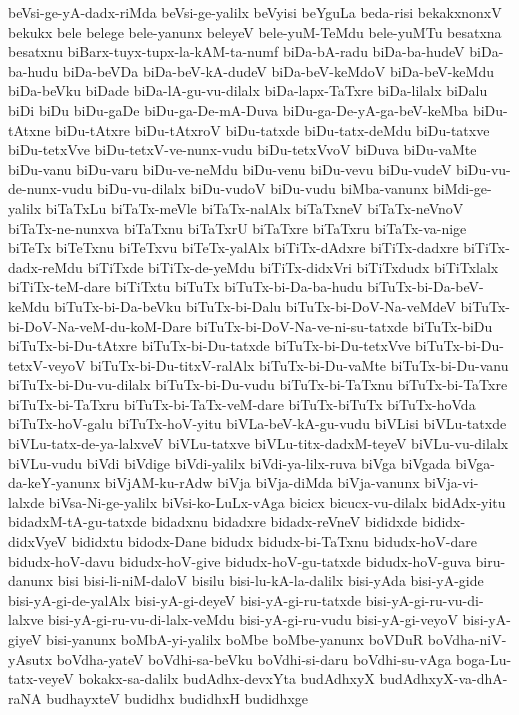 {beVsi-ge-yA-dadx-riMda
beVsi-ge-yalilx
beVyisi
beYguLa
beda-risi
bekakxnonxV
bekukx
bele
belege
bele-yanunx
beleyeV
bele-yuM-TeMdu
bele-yuMTu
besatxna
besatxnu
biBarx-tuyx-tupx-la-kAM-ta-numf
biDa-bA-radu
biDa-ba-hudeV
biDa-ba-hudu
biDa-beVDa
biDa-beV-kA-dudeV
biDa-beV-keMdoV
biDa-beV-keMdu
biDa-beVku
biDade
biDa-lA-gu-vu-dilalx
biDa-lapx-TaTxre
biDa-lilalx
biDalu
biDi
biDu
biDu-gaDe
biDu-ga-De-mA-Duva
biDu-ga-De-yA-ga-beV-keMba
biDu-tAtxne
biDu-tAtxre
biDu-tAtxroV
biDu-tatxde
biDu-tatx-deMdu
biDu-tatxve
biDu-tetxVve
biDu-tetxV-ve-nunx-vudu
biDu-tetxVvoV
biDuva
biDu-vaMte
biDu-vanu
biDu-varu
biDu-ve-neMdu
biDu-venu
biDu-vevu
biDu-vudeV
biDu-vu-de-nunx-vudu
biDu-vu-dilalx
biDu-vudoV
biDu-vudu
biMba-vanunx
biMdi-ge-yalilx
biTaTxLu
biTaTx-meVle
biTaTx-nalAlx
biTaTxneV
biTaTx-neVnoV
biTaTx-ne-nunxva
biTaTxnu
biTaTxrU
biTaTxre
biTaTxru
biTaTx-va-nige
biTeTx
biTeTxnu
biTeTxvu
biTeTx-yalAlx
biTiTx-dAdxre
biTiTx-dadxre
biTiTx-dadx-reMdu
biTiTxde
biTiTx-de-yeMdu
biTiTx-didxVri
biTiTxdudx
biTiTxlalx
biTiTx-teM-dare
biTiTxtu
biTuTx
biTuTx-bi-Da-ba-hudu
biTuTx-bi-Da-beV-keMdu
biTuTx-bi-Da-beVku
biTuTx-bi-Dalu
biTuTx-bi-DoV-Na-veMdeV
biTuTx-bi-DoV-Na-veM-du-koM-Dare
biTuTx-bi-DoV-Na-ve-ni-su-tatxde
biTuTx-biDu
biTuTx-bi-Du-tAtxre
biTuTx-bi-Du-tatxde
biTuTx-bi-Du-tetxVve
biTuTx-bi-Du-tetxV-veyoV
biTuTx-bi-Du-titxV-ralAlx
biTuTx-bi-Du-vaMte
biTuTx-bi-Du-vanu
biTuTx-bi-Du-vu-dilalx
biTuTx-bi-Du-vudu
biTuTx-bi-TaTxnu
biTuTx-bi-TaTxre
biTuTx-bi-TaTxru
biTuTx-bi-TaTx-veM-dare
biTuTx-biTuTx
biTuTx-hoVda
biTuTx-hoV-galu
biTuTx-hoV-yitu
biVLa-beV-kA-gu-vudu
biVLisi
biVLu-tatxde
biVLu-tatx-de-ya-lalxveV
biVLu-tatxve
biVLu-titx-dadxM-teyeV
biVLu-vu-dilalx
biVLu-vudu
biVdi
biVdige
biVdi-yalilx
biVdi-ya-lilx-ruva
biVga
biVgada
biVga-da-keY-yanunx
biVjAM-ku-rAdw
biVja
biVja-diMda
biVja-vanunx
biVja-vi-lalxde
biVsa-Ni-ge-yalilx
biVsi-ko-LuLx-vAga
bicicx
bicucx-vu-dilalx
bidAdx-yitu
bidadxM-tA-gu-tatxde
bidadxnu
bidadxre
bidadx-reVneV
bididxde
bididx-didxVyeV
bididxtu
bidodx-Dane
bidudx
bidudx-bi-TaTxnu
bidudx-hoV-dare
bidudx-hoV-davu
bidudx-hoV-give
bidudx-hoV-gu-tatxde
bidudx-hoV-guva
biru-danunx
bisi
bisi-li-niM-daloV
bisilu
bisi-lu-kA-la-dalilx
bisi-yAda
bisi-yA-gide
bisi-yA-gi-de-yalAlx
bisi-yA-gi-deyeV
bisi-yA-gi-ru-tatxde
bisi-yA-gi-ru-vu-di-lalxve
bisi-yA-gi-ru-vu-di-lalx-veMdu
bisi-yA-gi-ru-vudu
bisi-yA-gi-veyoV
bisi-yA-giyeV
bisi-yanunx
boMbA-yi-yalilx
boMbe
boMbe-yanunx
boVDuR
boVdha-niV-yAsutx
boVdha-yateV
boVdhi-sa-beVku
boVdhi-si-daru
boVdhi-su-vAga
boga-Lu-tatx-veyeV
bokakx-sa-dalilx
budAdhx-devxYta
budAdhxyX
budAdhxyX-va-dhA-raNA
budhayxteV
budidhx
budidhxH
budidhxge
}
